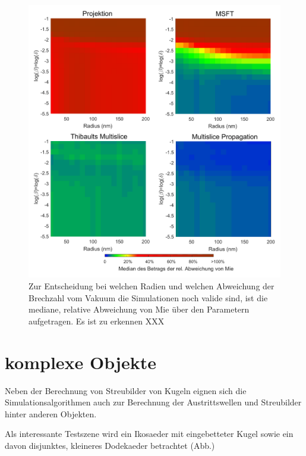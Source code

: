 \begin{figure}
	\centering
	\includegraphics[width=1\textwidth]{images/fig_sim_var.pdf}
	\caption[Gültigkeit der Simulationsalgorithmen]{Zur Entscheidung bei welchen Radien und welchen Abweichung der Brechzahl vom Vakuum die Simulationen noch valide sind, ist die mediane, relative Abweichung von Mie über den Parametern aufgetragen. Es ist zu erkennen XXX}
	\label{fig:variation}
\end{figure}



\section{komplexe Objekte}
Neben der Berechnung von Streubilder von Kugeln eignen sich die Simulationsalgorithmen auch zur Berechnung der Austrittswellen und Streubilder hinter anderen Objekten.

Als interessante Testszene wird ein Ikosaeder mit eingebetteter Kugel sowie ein davon disjunktes, kleineres Dodekaeder betrachtet (Abb.)


